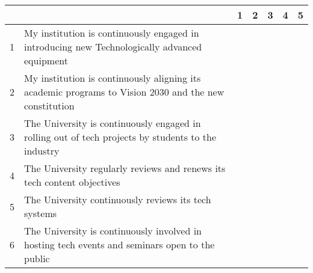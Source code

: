 \begin{tabular}{|l|l|l|l|l|l|l|}
\hline
   & & \textbf{1} & \textbf{2} & \textbf{3} & \textbf{4} & \textbf{5}\\ \hline
   1 & My institution is continuously engaged in introducing new Technologically advanced equipment & & & & &\\ \hline
   2 & My institution is continuously aligning its academic programs to Vision 2030 and the new constitution & & & & &\\ \hline
   3 & The University is continuously engaged in rolling out of tech projects by students to the industry & & & & &\\ \hline
   4 & The University regularly reviews and renews its tech content objectives & & & & &\\ \hline 
   5 & The University continuously reviews its tech systems & & & & &\\ \hline
   6 & The University is continuously involved in hosting tech events and seminars open to the public & & & & &\\ \hline
\end{tabular}
